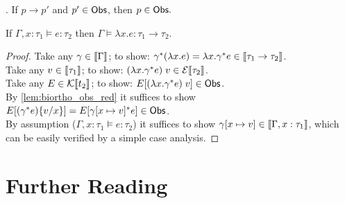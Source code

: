 \begin{lemma}\label{lem:biortho_obs_red}.
  If $p \longrightarrow p'$ and $p' \in \mathsf{Obs}$, then $p \in \mathsf{Obs}.$
\end{lemma}

\begin{lemma}
  If $\Gamma,x : \tau_1 \models e : \tau_2$
  then $\Gamma\models \lambda x.e : \tau_1 \to \tau_2$.
\end{lemma}
\begin{proof}
  Take any $\gamma \in \llbracket\Gamma\rrbracket$;
    to show: $\gamma^*(\lambda x.e) =
      \lambda x.\gamma^* e \in \llbracket\tau_1 \to \tau_2\rrbracket$. \\
  Take any $v \in \llbracket\tau_1\rrbracket$;
    to show: $(\lambda x.\gamma^* e)\;v \in \mathcal{E}\llbracket\tau_2\rrbracket$.\\
  Take any $E \in \mathcal{K}\llbracket t_2\rrbracket$;
    to show: $E[(\lambda x.\gamma^* e)\;v] \in \mathsf{Obs}$.\\
  By \autoref{lem:biortho_obs_red} it suffices to show
    $E[(\gamma^* e)\{v/x\}] = E[\gamma[x\mapsto v]^* e] \in \mathsf{Obs}$. \\
  By assumption ($\Gamma,x : \tau_1\models e : \tau_2$)
    it suffices to show $\gamma[x\mapsto v] \in \llbracket\Gamma,x : \tau_1\rrbracket$,
    which can be easily verified by a simple case analysis.
\end{proof}

\section{Further Reading}


